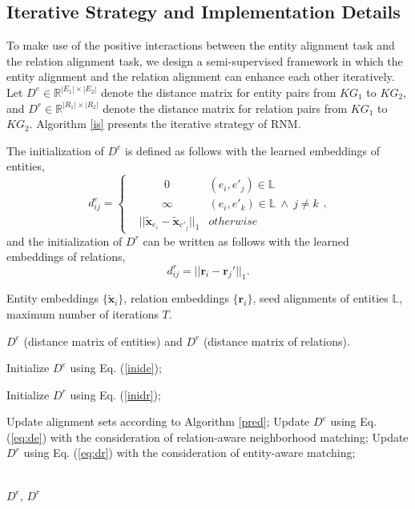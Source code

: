 \documentclass[letterpaper]{article} %
\begin{document}
\subsection{Iterative Strategy and Implementation Details}
To make use of the positive interactions between the entity
alignment task and the relation alignment task, we design a
semi-supervised framework in which the entity alignment and the
relation alignment can enhance each other iteratively. Let $D^e \in
\mathbb{R}^{|E_1| \times |E_2|}$ denote the distance matrix for
entity pairs from $KG_1$ to $KG_2$, and $D^r \in \mathbb{R}^{|R_1|
\times |R_2|}$ denote the distance matrix for relation pairs from
$KG_1$ to $KG_2$. Algorithm \ref{is} presents the iterative
strategy of RNM.

The initialization of $D^e$ is defined as follows with the learned
embeddings of entities,
\begin{equation}
d^e_{ij} = \left\{
\begin{aligned}
&\qquad \  0 & (e_i, e'_j) \in \mathbb{L} \\
& \qquad \infty & (e_i, e'_k) \in \mathbb{L}\ \wedge \  j\neq k \\
& || \tilde{\bm{x}}_{e_i} - \tilde{\bm{x}}_{e'_j} ||_{1}  &
otherwise
\end{aligned}
\right. , \label{inide}
\end{equation}
and the initialization of $D^r$ can be written as follows with the
learned embeddings of relations,
\begin{equation}
d^r_{ij} = || \bm{r}_i - \bm{r}_j' ||_{1}. \label{inidr}
\end{equation}

\begin{algorithm}[H]
\caption{Iterative Strategy of RNM}
\label{is}
\begin{algorithmic}[1]
\Require Entity embeddings $\{\tilde{\bm{x}}_i\}$, relation
embeddings $\{{\bm{r}}_i\}$, seed alignments of entities
$\mathbb{L}$, maximum number of iterations $T$.

\Ensure $D^e$ (distance matrix of entities) and $D^r$ (distance
matrix of relations).

\State Initialize $D^e$ using Eq. (\ref{inide});

\State Initialize $D^r$ using Eq. (\ref{inidr});

\Repeat

\State Update alignment sets according to
Algorithm \ref{pred};
\State Update $D^e$ using Eq. (\ref{eq:de})
with the consideration of relation-aware neighborhood matching;
\State Update $D^r$ using Eq. (\ref{eq:dr}) with the consideration
of entity-aware matching;

\\
\Return $D^e$, $D^r$
\end{algorithmic}
\end{algorithm}
\end{document}
